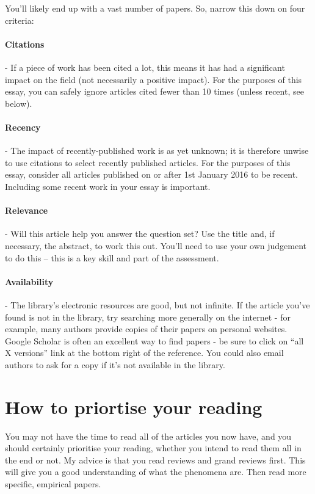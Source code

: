 \documentclass[11pt]{article}
\begin{document}
You'll likely end up with a vast number of papers. So, narrow this down on four criteria:

\paragraph{Citations} - If a piece of work has been cited a lot, this means it has had a significant impact on the field (not necessarily a positive impact). For the purposes of this essay, you can safely ignore articles cited fewer than 10 times (unless recent, see below).

\paragraph{Recency} - The impact of recently-published work is as yet unknown; it is therefore unwise to use citations to select recently published articles. For the purposes of this essay, consider all articles published on or after 1st January 2016 to be recent. Including some recent work in your essay is important.

\paragraph{Relevance} - Will this article help you answer the question set? Use the title and, if necessary, the abstract, to work this out. You'll need to use your own judgement to do this -- this is a key skill and part of the assessment.

\paragraph{Availability} - The library's electronic resources are good, but not infinite. If the article you've found is not in the library, try searching more generally on the internet - for example, many authors provide copies of their papers on personal websites. Google Scholar is often an excellent way to find papers - be sure to click on ``all X versions'' link at the bottom right of the reference. You could also email authors to ask for a copy if it's not available in the library.

\section*{How to priortise your reading}

You may not have the time to read all of the articles you now have, and you should certainly prioritise your reading, whether you intend to read them all in the end or not. My advice is that you read reviews and grand reviews first. This will give you a good understanding of what the phenomena are. Then read more specific, empirical papers. 
\end{document}
